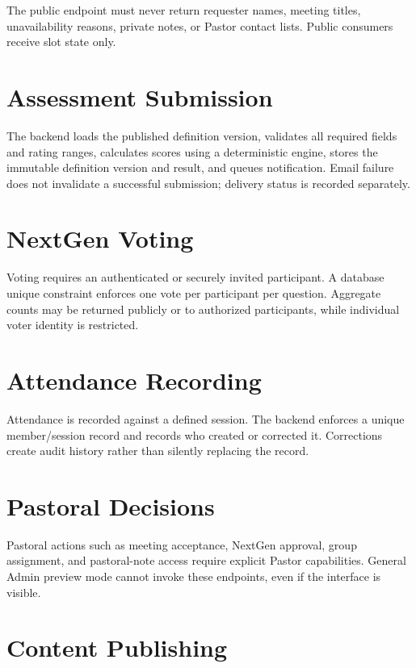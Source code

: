 \documentclass[11pt,a4paper,oneside]{report}
\begin{document}
\begin{criticalbox}
The public endpoint must never return requester names, meeting titles, unavailability reasons, private notes, or Pastor contact lists. Public consumers receive slot state only.
\end{criticalbox}

\section{Assessment Submission}

The backend loads the published definition version, validates all required fields and rating ranges, calculates scores using a deterministic engine, stores the immutable definition version and result, and queues notification. Email failure does not invalidate a successful submission; delivery status is recorded separately.

\section{NextGen Voting}

Voting requires an authenticated or securely invited participant. A database unique constraint enforces one vote per participant per question. Aggregate counts may be returned publicly or to authorized participants, while individual voter identity is restricted.

\section{Attendance Recording}

Attendance is recorded against a defined session. The backend enforces a unique member/session record and records who created or corrected it. Corrections create audit history rather than silently replacing the record.

\section{Pastoral Decisions}

Pastoral actions such as meeting acceptance, NextGen approval, group assignment, and pastoral-note access require explicit Pastor capabilities. General Admin preview mode cannot invoke these endpoints, even if the interface is visible.

\section{Content Publishing}
\end{document}

